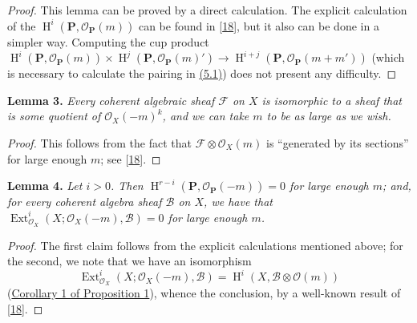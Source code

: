 \documentclass{article}
\newenvironment{itenv}[1]
  {\phantomsection\par\smallskip\noindent\textbf{#1.}\itshape}
  {\par\smallskip}
\theoremstyle{definition}
\theoremstyle{definition}
\theoremstyle{definition}
\theoremstyle{definition}
\theoremstyle{remark}
\begin{document}
\begin{proof}
This lemma can be proved by a direct calculation.
The explicit calculation of the \(\operatorname{H}^i(\mathbf{P},{\mathscr{O}}_\mathbf{P}(m))\) can be found in {[}\protect\hyperlink{ref-Ser1955}{18}{]}, but it also can be done in a simpler way.
Computing the cup product \(\operatorname{H}^i(\mathbf{P},{\mathscr{O}}_\mathbf{P}(m))\times\operatorname{H}^j(\mathbf{P},{\mathscr{O}}_\mathbf{P}(m)') \to \operatorname{H}^{i+j}(\mathbf{P},{\mathscr{O}}_\mathbf{P}(m+m'))\) (which is necessary to calculate the pairing in \protect\hyperlink{fga-1-equation-5.1}{(5.1)}) does not present any difficulty.
\end{proof}

\leavevmode{}%
\begin{itenv}{Lemma 3}
Every coherent algebraic sheaf \({\mathscr{F}}\) on \(X\) is isomorphic to a sheaf that is some quotient of \({\mathscr{O}}_X(-m)^k\), and we can take \(m\) to be as large as we wish.

\end{itenv}

\begin{proof}
This follows from the fact that \({\mathscr{F}}\otimes{\mathscr{O}}_X(m)\) is ``generated by its sections'' for large enough \(m\);
see {[}\protect\hyperlink{ref-Ser1955}{18}{]}.
\end{proof}

\leavevmode{}%
\begin{itenv}{Lemma 4}
Let \(i>0\).
Then \(\operatorname{H}^{r-i}(\mathbf{P},{\mathscr{O}}_\mathbf{P}(-m))=0\) for large enough \(m\);
and, for every coherent algebra sheaf \({\mathscr{B}}\) on \(X\), we have that \(\operatorname{Ext}_{{\mathscr{O}}_X}^i(X;{\mathscr{O}}_X(-m),{\mathscr{B}})=0\) for large enough \(m\).

\end{itenv}

\begin{proof}
The first claim follows from the explicit calculations mentioned above;
for the second, we note that we have an isomorphism
\[
  \operatorname{Ext}_{{\mathscr{O}}_X}^i(X;{\mathscr{O}}_X(-m),{\mathscr{B}}) = \operatorname{H}^i(X,{\mathscr{B}}\otimes{\mathscr{O}}(m))
\]
(\protect\hyperlink{fga-1-proposition-1-corollary-1}{Corollary 1 of Proposition 1}), whence the conclusion, by a well-known result of {[}\protect\hyperlink{ref-Ser1955}{18}{]}.
\end{proof}
\end{document}

